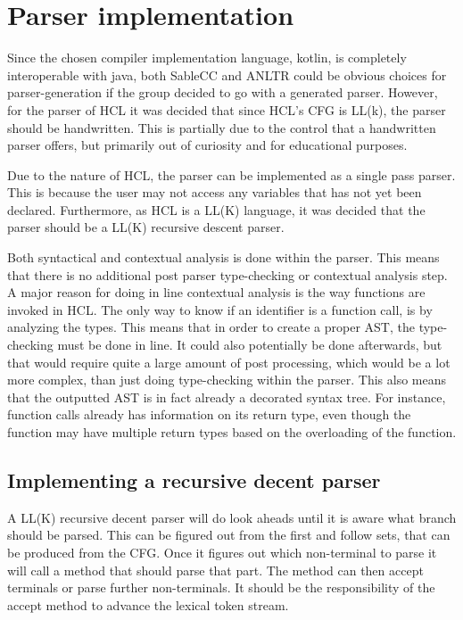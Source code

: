 \section{Parser implementation}

Since the chosen compiler implementation language, kotlin, is completely interoperable with java, both SableCC and ANLTR could be obvious choices for parser-generation if the group decided to go with a generated parser. 
However, for the parser of HCL it was decided that since HCL's CFG is LL(k), the parser should be handwritten. 
This is partially due to the control that a handwritten parser offers, but primarily out of curiosity and for educational purposes.

Due to the nature of HCL, the parser can be implemented as a single pass parser. 
This is because the user may not access any variables that has not yet been declared. 
Furthermore, as HCL is a LL(K) language, it was decided that the parser should be a LL(K) recursive descent parser.

Both syntactical and contextual analysis is done within the parser. 
This means that there is no additional post parser type-checking or contextual analysis step. 
A major reason for doing in line contextual analysis is the way functions are invoked in HCL. 
The only way to know if an identifier is a function call, is by analyzing the types. 
This means that in order to create a proper AST, the type-checking must be done in line. 
It could also potentially be done afterwards, but that would require quite a large amount of post processing, which would be a lot more complex, than just doing type-checking within the parser. 
This also means that the outputted AST is in fact already a decorated syntax tree. 
For instance, function calls already has information on its return type, even though the function may have multiple return types based on the overloading of the function.

\subsection{Implementing a recursive decent parser}

A LL(K) recursive decent parser will do look aheads until it is aware what branch should be parsed.
This can be figured out from the first and follow sets, that can be produced from the CFG.
Once it figures out which non-terminal to parse it will call a method that should parse that part.
The method can then accept terminals or parse further non-terminals.
It should be the responsibility of the accept method to advance the lexical token stream.

